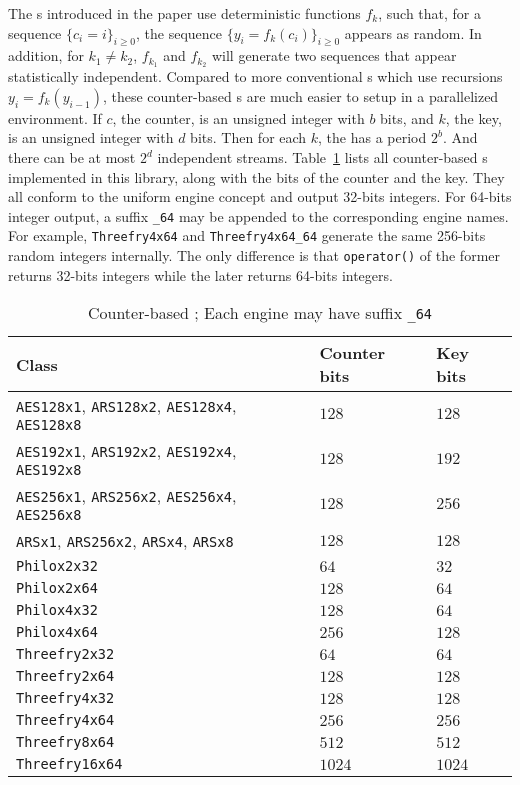 The \rng{}s introduced in the paper use deterministic functions $f_k$, such
that, for a sequence $\{c_i = i\}_{i\ge0}$, the sequence $\{y_i =
f_k(c_i)\}_{i\ge0}$ appears as random. In addition, for $k_1 \ne k_2$,
$f_{k_1}$ and $f_{k_2}$ will generate two sequences that appear statistically
independent. Compared to more conventional \rng{}s which use recursions $y_i =
f_k(y_{i - 1})$, these counter-based \rng{}s are much easier to setup in a
parallelized environment. If $c$, the counter, is an unsigned integer with $b$
bits, and $k$, the key, is an unsigned integer with $d$ bits. Then for each
$k$, the \rng has a period $2^b$. And there can be at most $2^d$ independent
streams. Table~\ref{tab:Counter-based RNG} lists all counter-based \rng{}s
implemented in this library, along with the bits of the counter and the key.
They all conform to the \cppoo uniform \rng engine concept and output 32-bits
integers. For 64-bits integer output, a suffix \verb|_64| may be appended to
the corresponding \rng engine names. For example, \verb|Threefry4x64| and
\verb|Threefry4x64_64| generate the same 256-bits random integers internally.
The only difference is that \verb|operator()| of the former returns 32-bits
integers while the later returns 64-bits integers.

\begin{table}
  \tbfigures
  \begin{tabularx}{\textwidth}{lXX}
    \toprule
    Class & Counter bits & Key bits \\
    \midrule
    \verb|AES128x1|, \verb|ARS128x2|, \verb|AES128x4|, \verb|AES128x8|
    & $128$  & $128$  \\
    \verb|AES192x1|, \verb|ARS192x2|, \verb|AES192x4|, \verb|AES192x8|
    & $128$  & $192$  \\
    \verb|AES256x1|, \verb|ARS256x2|, \verb|AES256x4|, \verb|AES256x8|
    & $128$  & $256$  \\
    \verb|ARSx1|, \verb|ARS256x2|, \verb|ARSx4|, \verb|ARSx8|
    & $128$  & $128$  \\
    \verb|Philox2x32|    & $64$   & $32$   \\
    \verb|Philox2x64|    & $128$  & $64$   \\
    \verb|Philox4x32|    & $128$  & $64$   \\
    \verb|Philox4x64|    & $256$  & $128$  \\
    \verb|Threefry2x32|  & $64$   & $64$   \\
    \verb|Threefry2x64|  & $128$  & $128$  \\
    \verb|Threefry4x32|  & $128$  & $128$  \\
    \verb|Threefry4x64|  & $256$  & $256$  \\
    \verb|Threefry8x64|  & $512$  & $512$  \\
    \verb|Threefry16x64| & $1024$ & $1024$ \\
    \bottomrule
  \end{tabularx}
  \caption{Counter-based \rng; Each \rng engine may have suffix \texttt{\_64}}
  \label{tab:Counter-based RNG}
\end{table}

